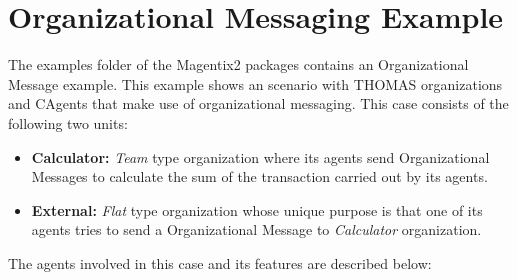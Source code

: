 \section{Organizational Messaging Example}

The examples folder of the Magentix2 packages contains an Organizational Message example. This example shows an scenario with THOMAS organizations and CAgents that make use of organizational messaging. This case consists of the following two units:

\begin{itemize}
\item \textbf{Calculator:} \textit{Team} type organization where its agents send Organizational Messages to
  calculate the sum of the transaction carried out by its agents.
\item \textbf{External:} \textit{Flat} type organization whose unique purpose is that one of its agents
  tries to send a Organizational Message to \textit{Calculator} organization.
\end{itemize}

The agents involved in this case and its features are described below:


